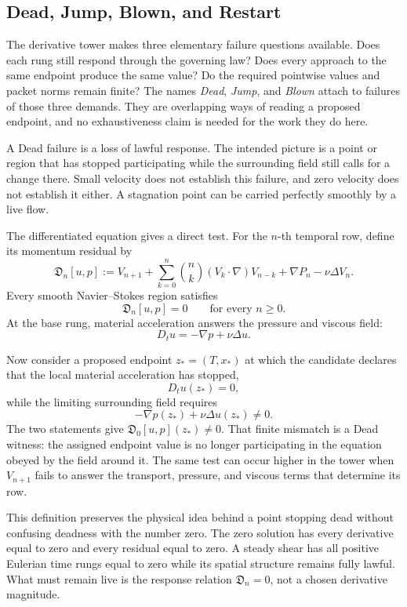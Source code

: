 \subsection{Dead, Jump, Blown, and Restart}\label{sub:DeadJumpBlownAndRestart}

The derivative tower makes three elementary failure questions available.
Does each rung still respond through the governing law?
Does every approach to the same endpoint produce the same value?
Do the required pointwise values and packet norms remain finite?
The names \emph{Dead}, \emph{Jump}, and \emph{Blown} attach to failures of those three demands.
They are overlapping ways of reading a proposed endpoint, and no exhaustiveness claim is needed for the work they do here.


A Dead failure is a loss of lawful response.
The intended picture is a point or region that has stopped participating while the surrounding field still calls for a change there.
Small velocity does not establish this failure, and zero velocity does not establish it either.
A stagnation point can be carried perfectly smoothly by a live flow.

The differentiated equation gives a direct test.
For the \(n\)-th temporal row, define its momentum residual by
\[
  \mathfrak D_n[u,p]
  :=
  V_{n+1}
  +
  \sum_{k=0}^{n}
  \binom{n}{k}
  (V_k\cdot\nabla)V_{n-k}
  +
  \nabla P_n
  -
  \nu\Delta V_n.
\]
Every smooth Navier--Stokes region satisfies
\[
  \mathfrak D_n[u,p]=0
  \qquad
  \text{for every }n\geq0.
\]
At the base rung, material acceleration answers the pressure and viscous field:
\[
  D_tu=-\nabla p+\nu\Delta u.
\]

Now consider a proposed endpoint \(z_*=(T,x_*)\) at which the candidate declares that the local material acceleration has stopped,
\[
  D_tu(z_*)=0,
\]
while the limiting surrounding field requires
\[
  -\nabla p(z_*)+\nu\Delta u(z_*)\neq0.
\]
The two statements give \(\mathfrak D_0[u,p](z_*)\neq0\).
That finite mismatch is a Dead witness: the assigned endpoint value is no longer participating in the equation obeyed by the field around it.
The same test can occur higher in the tower when \(V_{n+1}\) fails to answer the transport, pressure, and viscous terms that determine its row.

This definition preserves the physical idea behind a point stopping dead without confusing deadness with the number zero.
The zero solution has every derivative equal to zero and every residual equal to zero.
A steady shear has all positive Eulerian time rungs equal to zero while its spatial structure remains fully lawful.
What must remain live is the response relation \(\mathfrak D_n=0\), not a chosen derivative magnitude.

